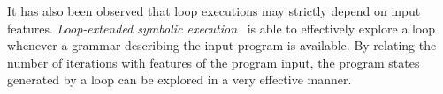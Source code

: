 It has also been observed that loop executions may strictly depend on input features. {\em Loop-extended symbolic execution}~\cite{SPM-ISSTA09} is able to effectively explore a loop whenever a grammar describing the input program is available. By relating the number of iterations with features of the program input, the program states generated by a loop can be explored in a very effective manner.


\begin{comment}
Many prior works have targeted the problem of mitigating the path explosion effect due to symbolic execution of loops. We briefly discuss the main ideas introduced by these papers. 
\begin{itemize}

  \item {\em preconditions}: the symbolic execution of a loop can be made easier if some preconditions are known on the symbolic variables involved in the loop. For instance, if the number of loop iterations is known, the engine can drastically prune branching paths. For instance, this information may be determined using some static analysis techniques. Section~\ref{precontioned-symbolic-execution} provides a more general discussion of how preconditions can help symbolic execution.

  \item {\em fixed vs fully exploration}: depending on the goal, a symbolic engine may decide to fully explore a loop (e.g., see heuristics presented in~\cite{AEG-NDSS11} and discussed in Section~\ref{heuristics}) or to explore only a fixed number of iterations (e.g., up to 3 iterations) in order to avoid path explosion.

  \item {\em approximations}: effects of a loop are often approximated using {\em fixpoints} (e.g., in~\cite{KKM-USEC05,BNS-SP06,CFB-ACSAC06}). A fixpoint F is an approximation of the effect of loop body on an execution state. F approximates the state after the execution of loop whenever the initial state before the loop was F (?). Transforming an execution state to a fixpoint state is defined as widening. Construction of the fixpoint:
  \begin{itemize}
    \item S1: state after first iteration
    \item S2: state after second iteration
    \item compare S1 and S2: assign bottom to each symbol that has been altered
    \item repeat until there is no difference between Si and Si+1
    \item if there is a branch inside the loop, then either the branch is known or its condition is on a symbol which has been assign to bottom. In this case, two parallel states are created and then compared.
  \end{itemize}


\end{comment}
